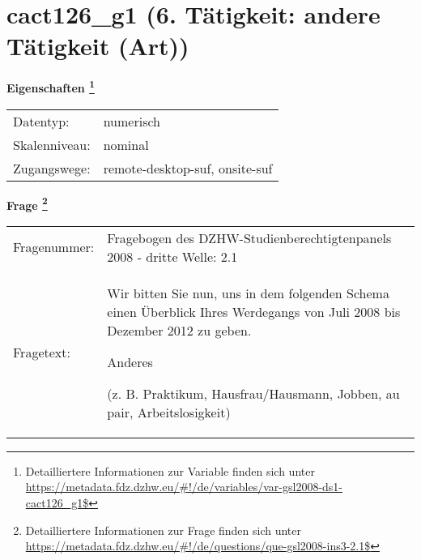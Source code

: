 
    \setcounter{footnote}{0}

    \vspace*{-1.8cm}
	\section{cact126\_g1 (6. Tätigkeit: andere Tätigkeit (Art))}
	\label{section:cact126_g1}



    \vspace*{0.5cm}
    \noindent\textbf{Eigenschaften
	\footnote{Detailliertere Informationen zur Variable finden sich unter
		\url{https://metadata.fdz.dzhw.eu/\#!/de/variables/var-gsl2008-ds1-cact126_g1$}}}\\
	\begin{tabularx}{\hsize}{@{}lX}
	Datentyp: & numerisch \\
	Skalenniveau: & nominal \\
	Zugangswege: &
	  remote-desktop-suf, 
	  onsite-suf
 \\
    \end{tabularx}



				\vspace*{0.5cm}
                \noindent\textbf{Frage
	                \footnote{Detailliertere Informationen zur Frage finden sich unter
		              \url{https://metadata.fdz.dzhw.eu/\#!/de/questions/que-gsl2008-ins3-2.1$}}}\\
				\begin{tabularx}{\hsize}{@{}lX}
					Fragenummer: &
					  Fragebogen des DZHW-Studienberechtigtenpanels 2008 - dritte Welle:
					  2.1
 \\
					Fragetext: & Wir bitten Sie nun, uns in dem folgenden Schema einen Überblick Ihres Werdegangs von Juli 2008 bis Dezember 2012 zu geben.\par  Anderes\par  (z. B. Praktikum, Hausfrau/Hausmann, Jobben, au pair, Arbeitslosigkeit) \\
				\end{tabularx}





